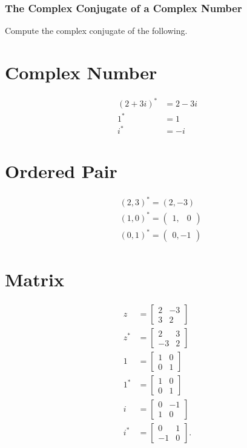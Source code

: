\documentclass[10pt]{article}
\begin{document}
\subsubsection{The Complex Conjugate of a Complex Number}
Compute the complex conjugate of the following.

\section{Complex Number}
$$
\begin{aligned}
(2+3 i)^{*} & =2-3 i \\
1^{*} & =1 \\
i^{*} & =-i
\end{aligned}
$$

\section{Ordered Pair}
$$
\begin{aligned}
& (2,3)^{*}=(2,-3) \\
& (1,0)^{*}=\left(\begin{array}{ll}
1, & 0
\end{array}\right) \\
& (0,1)^{*}=\left(\begin{array}{ll}
0,-1
\end{array}\right)
\end{aligned}
$$

\section{Matrix}
$$
\begin{aligned}
z & =\left[\begin{array}{cc}
2 & -3 \\
3 & 2
\end{array}\right] \\
z^{*} & =\left[\begin{array}{cc}
2 & 3 \\
-3 & 2
\end{array}\right] \\
1 & =\left[\begin{array}{ll}
1 & 0 \\
0 & 1
\end{array}\right] \\
1^{*} & =\left[\begin{array}{ll}
1 & 0 \\
0 & 1
\end{array}\right] \\
i & =\left[\begin{array}{cc}
0 & -1 \\
1 & 0
\end{array}\right] \\
i^{*} & =\left[\begin{array}{cc}
0 & 1 \\
-1 & 0
\end{array}\right] .
\end{aligned}
$$
\end{document}
